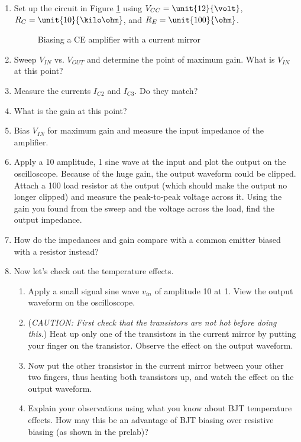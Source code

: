 \documentclass{article}
\begin{document}
\begin{enumerate}
	\item Set up the circuit in Figure \ref{lab6_cmirror2} using $V_{CC} = \unit{12}{\volt}$, $R_{C} = \unit{10}{\kilo\ohm}$, and $R_{E} = \unit{100}{\ohm}$.
	
	\begin{figure}[!htb]
		
		\centerline{\box\graph}
		\caption{Biasing a CE amplifier with a current mirror}
		\label{lab6_cmirror2}
	\end{figure}
	
	\item Sweep $V_{IN}$ vs. $V_{OUT}$ and determine the point of maximum gain. What is $V_{IN}$ at this point?
	\item Measure the currents $I_{C2}$ and $I_{C3}$. Do they match? 
	\item What is the gain at this point?
	\item Bias $V_{IN}$ for maximum gain and measure the input impedance of the amplifier.
	\item Apply a \unit{10}{\milli\volt} amplitude, \unit{1}{\kilo\hertz} sine wave at the input and plot the output on the oscilloscope. Because of the huge gain, the output waveform could be clipped. Attach a \unit{100}{\kilo\ohm} load resistor at the output (which should make the output no longer clipped) and measure the peak-to-peak voltage across it. Using the gain you found from the sweep and the voltage across the load, find the output impedance.
	\item How do the impedances and gain compare with a common emitter biased with a resistor instead?
	\item Now let's check out the temperature effects.
	\begin{enumerate}
		\item Apply a small signal sine wave $v_{in}$ of amplitude \unit{10}{\milli\volt} at \unit{1}{\kilo\hertz}. View the output waveform on the oscilloscope.
		\item (\textit{CAUTION: First check that the transistors are not hot before doing this.}) Heat up only one of the transistors in the current mirror by putting your finger on the transistor. Observe the effect on the output waveform.
		\item Now put the other transistor in the current mirror between your other two fingers, thus heating both transistors up, and watch the effect on the output waveform.
		\item Explain your observations using what you know about BJT temperature effects. How may this be an advantage of BJT biasing over resistive biasing (as shown in the prelab)?
	\end{enumerate}
\end{enumerate}
\end{document}
